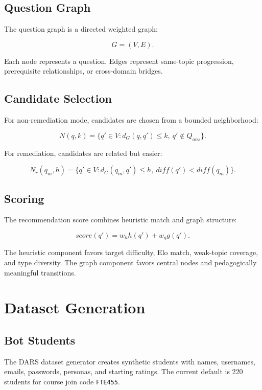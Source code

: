 \documentclass[12pt,a4paper]{report}
\begin{document}
\section{Question Graph}
The question graph is a directed weighted graph:

\begin{equation}
G=(V,E).
\end{equation}

Each node represents a question. Edges represent same-topic progression, prerequisite relationships, or cross-domain bridges.

\section{Candidate Selection}
For non-remediation mode, candidates are chosen from a bounded neighborhood:

\begin{equation}
N(q,k)=\{q' \in V : d_G(q,q') \leq k,\ q'\notin Q_{ans}\}.
\end{equation}

For remediation, candidates are related but easier:

\begin{equation}
N_r(q_m,h)=\{q' \in V : d_G(q_m,q') \leq h,\ diff(q') < diff(q_m)\}.
\end{equation}

\section{Scoring}
The recommendation score combines heuristic match and graph structure:

\begin{equation}
score(q') = w_h h(q') + w_g g(q').
\end{equation}

The heuristic component favors target difficulty, Elo match, weak-topic coverage, and type diversity. The graph component favors central nodes and pedagogically meaningful transitions.

\chapter{Dataset Generation}
\section{Bot Students}
The DARS dataset generator creates synthetic students with names, usernames, emails, passwords, personas, and starting ratings. The current default is 220 students for course join code \texttt{FTE455}.
\end{document}
